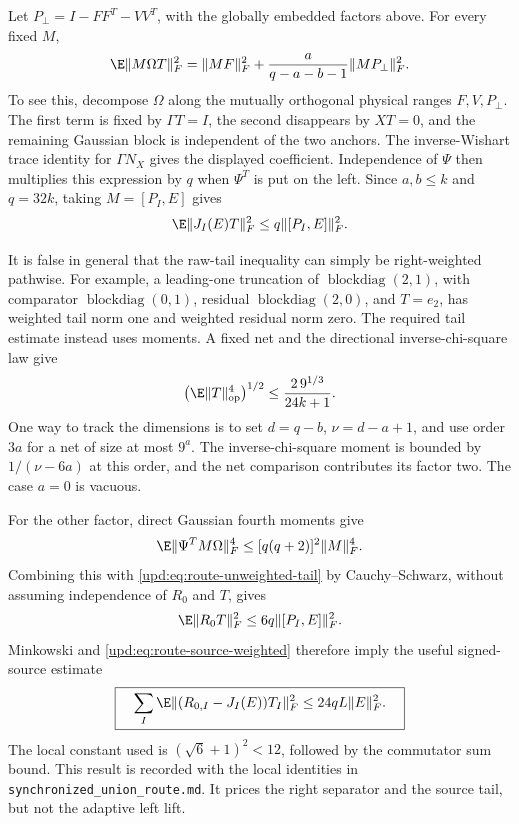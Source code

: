\documentclass[11pt,oneside,openany,a4paper]{book}
\numberwithin{equation}{chapter}
\theoremstyle{definition}
\theoremstyle{remark}
\DeclareMathOperator{\diag}{blockdiag}\DeclareMathOperator{\range}{range}
\newcommand{\sourcefile}[1]{{\small\nolinkurl{#1}}}
\begin{document}
Let $P_\perp=I-FF^T-VV^T$, with the globally embedded factors above.
For every fixed $M$,
\begin{equation}
 \E\lVert M\Omega T\rVert_F^2
 =\lVert MF\rVert_F^2+
   \frac{a}{q-a-b-1}\lVert MP_\perp\rVert_F^2.
 \label{upd:eq:route-fixed-separator-moment}
\end{equation}
To see this, decompose $\Omega$ along the mutually orthogonal physical
ranges $F,V,P_\perp$.  The first term is fixed by $\Gamma T=I$, the
second disappears by $XT=0$, and the remaining Gaussian block is
independent of the two anchors.  The inverse-Wishart trace identity for
$\Gamma N_X$ gives the displayed coefficient.  Independence of $\Psi$
then multiplies this expression by $q$ when $\Psi^T$ is put on the left.
Since $a,b\leq k$ and $q=32k$, taking $M=[P_I,E]$ gives
\begin{equation}
 \E\lVert J_I(E)T\rVert_F^2
 \leq q\lVert[P_I,E]\rVert_F^2.
 \label{upd:eq:route-source-weighted}
\end{equation}

It is false in general that the raw-tail inequality can simply be
right-weighted pathwise.  For example, a leading-one truncation of
$\diag(2,1)$, with comparator $\diag(0,1)$, residual $\diag(2,0)$, and
$T=e_2$, has weighted tail norm one and weighted residual norm zero.
The required tail estimate instead uses moments.  A fixed net and the
directional inverse-chi-square law give
\[
 \bigl(\E\lVert T\rVert_{\mathrm{op}}^4\bigr)^{1/2}
 \leq\frac{2\,9^{1/3}}{24k+1}.
\]
One way to track the dimensions is to set
$d=q-b$, $\nu=d-a+1$, and use order $3a$ for a net of size at most
$9^a$.  The inverse-chi-square moment is bounded by
$1/(\nu-6a)$ at this order, and the net comparison contributes its
factor two.  The case $a=0$ is vacuous.

For the other factor, direct Gaussian fourth moments give
\[
 \E\lVert\Psi^TM\Omega\rVert_F^4
 \leq[q(q+2)]^2\lVert M\rVert_F^4.
\]
Combining this with \eqref{upd:eq:route-unweighted-tail} by
Cauchy--Schwarz, without assuming independence of $R_0$ and $T$, gives
\[
 \E\lVert R_0T\rVert_F^2
 \leq6q\lVert[P_I,E]\rVert_F^2.
\]
Minkowski and \eqref{upd:eq:route-source-weighted} therefore imply the
useful signed-source estimate
\begin{equation}
 \boxed{\quad
 \sum_I\E\lVert(R_{0,I}-J_I(E))T_I\rVert_F^2
 \leq24qL\lVert E\rVert_F^2.
 \quad}
 \label{upd:eq:route-24q}
\end{equation}
The local constant used is
$(\sqrt6+1)^2<12$, followed by the commutator sum bound.  This result
is recorded with the local identities in
\sourcefile{synchronized_union_route.md}.  It prices the right
separator and the source tail, but not the adaptive left lift.
\end{document}
